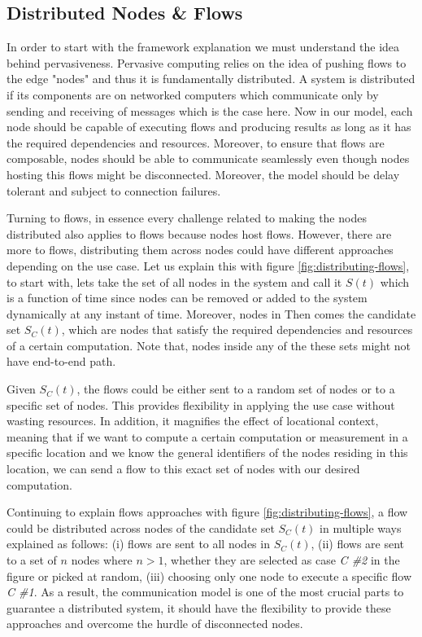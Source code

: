 \subsection{Distributed Nodes \& Flows}
In order to start with the framework explanation we must understand the idea behind pervasiveness. Pervasive computing relies on the idea of pushing flows to the edge "nodes" and thus it is fundamentally distributed. A system is distributed if its components  are on networked computers which communicate only by sending and receiving of messages \cite{DSYS} which is the case here. Now in our model, each node should be capable of executing flows and producing results as long as it has the required dependencies and resources. Moreover, to ensure that flows are composable, nodes should be able to communicate seamlessly even though nodes hosting this flows might be disconnected. Moreover, the model should be delay tolerant and subject to connection failures.



Turning to flows, in essence every challenge related to making the nodes distributed also applies to flows because nodes host flows. However, there are more to flows, distributing them across nodes could have different approaches depending on the use case. Let us explain this with figure \ref{fig:distributing-flows}, to start with, lets take the set of all nodes in the system and call it \(S(t)\) which is a function of time since nodes can be removed or added to the system dynamically at any instant of time. Moreover, nodes in  Then comes the candidate set \(S_C(t)\), which are nodes that satisfy the required dependencies and resources of a certain computation. Note that, nodes inside any of the these sets might not have end-to-end path.

Given \(S_C(t)\), the flows could be either sent to a random set of nodes or to a specific set of nodes. This provides flexibility in applying the use case without wasting resources. In addition, it magnifies the effect of locational context, meaning that if we want to compute a certain computation or measurement in a specific location  and we know the general identifiers of  the  nodes residing in this location, we can send a flow to this exact set of nodes with our desired computation. 

Continuing to explain flows approaches with figure \ref{fig:distributing-flows}, a flow could be distributed across nodes of the candidate set  \(S_C(t)\) in multiple ways explained as follows: (i) flows are sent to all nodes in  \(S_C(t)\), (ii) flows are sent to a set of  \(n\)  nodes where \(n > 1\), whether they are selected as case \textit{C \#2} in the figure or picked at random, (iii) choosing only one node to execute a specific flow \textit{C \#1}. As a result, the communication model is one of the most crucial parts to guarantee a distributed system, it should have the flexibility to provide these approaches and overcome the hurdle of disconnected nodes.
 
